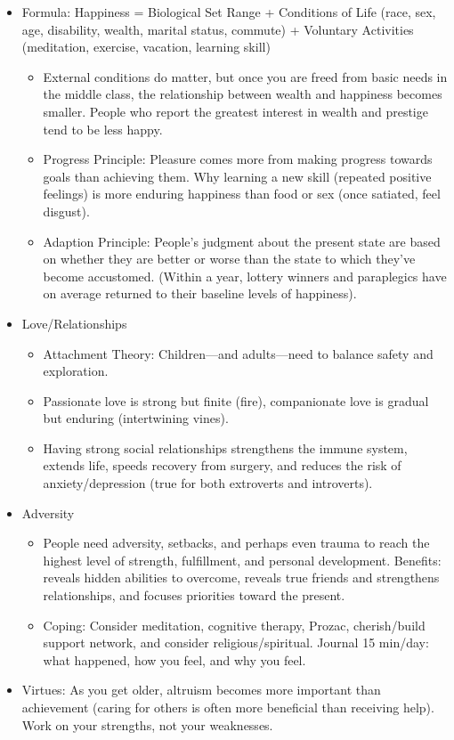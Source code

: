 \documentclass[
]{article}
\begin{document}
\begin{itemize}
\item
  Formula: Happiness = Biological Set Range + Conditions of Life (race,
  sex, age, disability, wealth, marital status, commute) + Voluntary
  Activities (meditation, exercise, vacation, learning skill)

  \begin{itemize}
  \item
    External conditions do matter, but once you are freed from basic
    needs in the middle class, the relationship between wealth and
    happiness becomes smaller. People who report the greatest interest
    in wealth and prestige tend to be less happy.
  \item
    Progress Principle: Pleasure comes more from making progress towards
    goals than achieving them. Why learning a new skill (repeated
    positive feelings) is more enduring happiness than food or sex (once
    satiated, feel disgust).
  \item
    Adaption Principle: People's judgment about the present state are
    based on whether they are better or worse than the state to which
    they've become accustomed. (Within a year, lottery winners and
    paraplegics have on average returned to their baseline levels of
    happiness).
  \end{itemize}
\item
  Love/Relationships

  \begin{itemize}
  \item
    Attachment Theory: Children---and adults---need to balance safety
    and exploration.
  \item
    Passionate love is strong but finite (fire), companionate love is
    gradual but enduring (intertwining vines).
  \item
    Having strong social relationships strengthens the immune system,
    extends life, speeds recovery from surgery, and reduces the risk of
    anxiety/depression (true for both extroverts and introverts).
  \end{itemize}
\item
  Adversity

  \begin{itemize}
  \item
    People need adversity, setbacks, and perhaps even trauma to reach
    the highest level of strength, fulfillment, and personal
    development. Benefits: reveals hidden abilities to overcome, reveals
    true friends and strengthens relationships, and focuses priorities
    toward the present.
  \item
    Coping: Consider meditation, cognitive therapy, Prozac,
    cherish/build support network, and consider religious/spiritual.
    Journal 15 min/day: what happened, how you feel, and why you feel.
  \end{itemize}
\item
  Virtues: As you get older, altruism becomes more important than
  achievement (caring for others is often more beneficial than receiving
  help). Work on your strengths, not your weaknesses.


\end{itemize}
\end{document}
